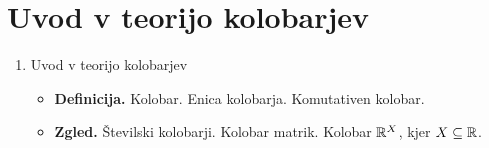 \section{Uvod v teorijo kolobarjev}

\begin{enumerate}
    \item Uvod v teorijo kolobarjev
    \begin{itemize}
        \item \textbf{Definicija.} Kolobar. Enica kolobarja. Komutativen kolobar.
        \item \textbf{Zgled.} Številski kolobarji. Kolobar matrik. Kolobar \(\mathbb{R}^X\), kjer \(X \subseteq \mathbb{R}\).
    \end{itemize}
\end{enumerate}
